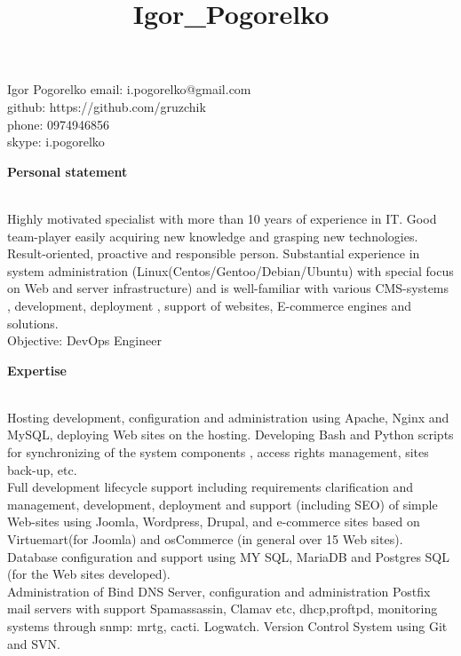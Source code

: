 \documentclass[letterpaper]{article}
\date{}
\title{Igor\_Pogorelko}
\makeatletter
\newcommand{\resheader}[6]{
    \begin{tabular*}{\textwidth}{l@{\extracolsep{\fill}}cr}
    #3 & \textbf{\LARGE #1} & #5\\
    #4 & \url{#2}           & #6\\
    \end{tabular*}
    \\
    \vspace{0.1in}
}
\renewcommand{\section}[1]{
  {
    \large \colorbox{my-gray}{
      \begin{minipage}
        {\textwidth-0.175in}
        {\textbf{#1 \vphantom{p\^{E}}}}
      \end{minipage}
    }
  }
}
\renewcommand\maketitle{}
\makeatother
\begin{document}
\maketitle
{\LARGE Igor Pogorelko} \hfill {email: i.pogorelko@gmail.com}\\
\hfill {github: https://github.com/gruzchik}\\
\hfill {phone: 0974946856}\\
\hfill {skype: i.pogorelko}\\
\vspace*{1em plus .6em minus .5em}
\section{Personal statement}
\label{sec-1-1}
\\
Highly motivated specialist with more than 10 years of experience in IT. Good team-player easily acquiring new knowledge and grasping new technologies.\\
Result-oriented, proactive and responsible person. 
Substantial experience in system administration (Linux(Centos/Gentoo/Debian/Ubuntu) with special focus on Web and server infrastructure) and is well-familiar with various CMS-systems , development, deployment , support  of websites, E-commerce engines and solutions.\\
\vspace*{1em plus .6em minus .5em}
Objective:  DevOps Engineer\\
\section{Expertise}
\label{sec-1-1}
\\
Hosting development, configuration and administration using Apache, Nginx and MySQL, deploying Web sites on the hosting. Developing Bash and Python scripts for synchronizing of the system components , access rights management, sites back-up, etc.\\
Full development lifecycle support including requirements clarification and management, development, deployment and support (including SEO) of simple Web-sites using Joomla, Wordpress, Drupal, and e-commerce sites based on Virtuemart(for Joomla) and osCommerce (in general over 15 Web sites). Database configuration and support using MY SQL, MariaDB and Postgres SQL (for the Web sites developed).\\
Administration of Bind DNS Server, configuration and administration Postfix mail servers with support Spamassassin, Clamav etc, dhcp,proftpd, monitoring systems through snmp: mrtg, cacti. Logwatch. Version Control System using Git and SVN.
\end{document}

